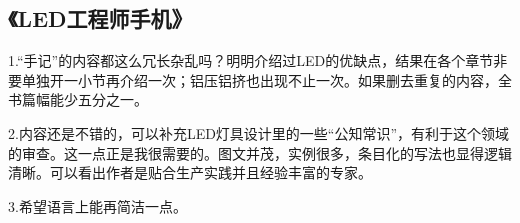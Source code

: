 \subsection{《LED工程师手机》
}
1.“手记”的内容都这么冗长杂乱吗？明明介绍过LED的优缺点，结果在各个章节非要单独开一小节再介绍一次；铝压铝挤也出现不止一次。如果删去重复的内容，全书篇幅能少五分之一。

2.内容还是不错的，可以补充LED灯具设计里的一些“公知常识”，有利于这个领域的审查。这一点正是我很需要的。图文并茂，实例很多，条目化的写法也显得逻辑清晰。可以看出作者是贴合生产实践并且经验丰富的专家。

3.希望语言上能再简洁一点。
